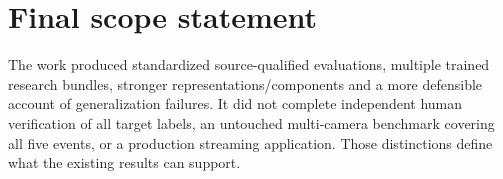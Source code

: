 \section{Final scope statement}
The work produced standardized source-qualified evaluations, multiple trained research bundles, stronger representations/components and a more defensible account of generalization failures. It did not complete independent human verification of all target labels, an untouched multi-camera benchmark covering all five events, or a production streaming application. Those distinctions define what the existing results can support.
